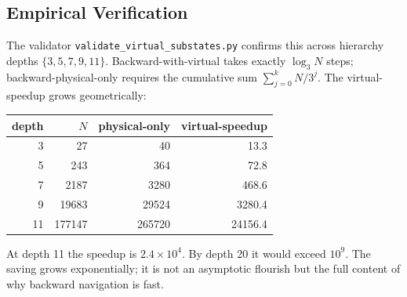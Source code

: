 \documentclass[twocolumn,11pt,a4paper]{article}
\begin{document}
\subsection{Empirical Verification}

The validator \texttt{validate\_virtual\_substates.py} confirms this across hierarchy depths $\{3, 5, 7, 9, 11\}$. Backward-with-virtual takes exactly $\log_3 N$ steps; backward-physical-only requires the cumulative sum $\sum_{j=0}^k N/3^j$. The virtual-speedup grows geometrically:

\begin{center}
\begin{tabular}{rrrr}
\toprule
depth & $N$ & physical-only & virtual-speedup \\
\midrule
3  & 27      & 40      & 13.3\x  \\
5  & 243     & 364     & 72.8\x  \\
7  & 2187    & 3280    & 468.6\x \\
9  & 19683   & 29524   & 3280.4\x \\
11 & 177147  & 265720  & 24156.4\x \\
\bottomrule
\end{tabular}
\end{center}

At depth 11 the speedup is $2.4 \times 10^4$. By depth 20 it would exceed $10^9$. The saving grows exponentially; it is not an asymptotic flourish but the full content of why backward navigation is fast.
\end{document}
